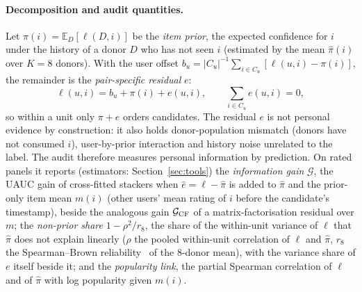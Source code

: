 \paragraph{Decomposition and audit quantities.}
Let $\pi(i)=\mathbb E_D[\ell(D,i)]$ be the \emph{item prior}, the expected confidence for $i$ under the history of a donor
$D$ who has not seen $i$ (estimated by the mean $\hat\pi(i)$ over $K=8$ donors). With the user offset
$b_u=|C_u|^{-1}\sum_{i\in C_u}[\ell(u,i)-\pi(i)]$, the remainder is the \emph{pair-specific residual} $e$:
\begin{equation}\label{eq:decomp}
  \ell(u,i)=b_u+\pi(i)+e(u,i),\qquad \textstyle\sum_{i\in C_u}e(u,i)=0,
\end{equation}
so within a unit only $\pi+e$ orders candidates. The residual $e$ is not personal evidence by construction: it also holds
donor-population mismatch (donors have not consumed $i$), user-by-prior interaction and history noise unrelated to the label. The
audit therefore measures personal information by prediction. On rated panels it reports (estimators: Section~\ref{sec:tools}) the
\emph{information gain} $\mathcal G$, the UAUC gain of cross-fitted stackers when $\hat e=\ell-\hat\pi$ is added to $\hat\pi$ and
the prior-only item mean $m(i)$ (other users' mean rating of $i$ before the candidate's timestamp), beside the analogous gain
$\mathcal G_{\rm CF}$ of a matrix-factorisation residual over $m$; the \emph{non-prior share} $1-\rho^2/r_8$, the share of
the within-unit variance of $\ell$ that $\hat\pi$ does not explain linearly ($\rho$ the pooled within-unit correlation of $\ell$
and $\hat\pi$, $r_8$ the Spearman--Brown reliability~\citep{spearman1910correlation,brown1910experimental} of the 8-donor mean),
with the variance share of $e$ itself beside it; and the \emph{popularity link}, the partial Spearman correlation of $\ell$ and
of $\hat\pi$ with log popularity given $m(i)$.

